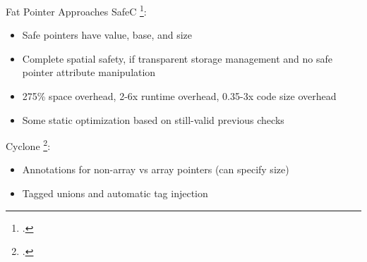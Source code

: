 \documentclass[aspectratio=169]{beamer}
\begin{document}
\begin{frame}{Fat Pointer Approaches}
SafeC \footcite{austin_efficient_1994}:
\begin{itemize}
  \item \alert{Safe} pointers have value, base, and size
  \item Complete spatial safety, if \alert{transparent} storage management and no safe pointer attribute \alert{manipulation} 
  \item 275\% space overhead, 2-6x runtime overhead, 0.35-3x code size overhead 
  \item Some static optimization based on still-valid previous checks
\end{itemize}

\pause 

Cyclone \footcite{jim_cyclone:_2002}: 
\begin{itemize}
    \item Annotations for non-array vs array pointers (can specify size) %
    \item Tagged unions and automatic tag injection 
\end{itemize}
\vspace{0.1in}

\end{frame}
\end{document}
